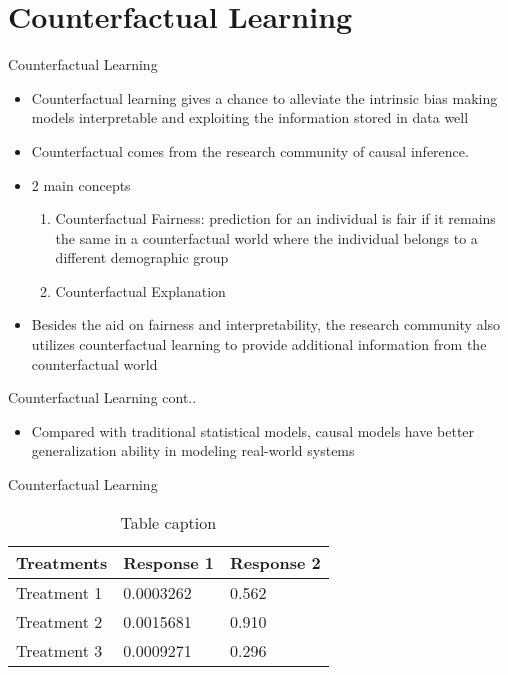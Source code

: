 \documentclass[aspectratio=169,xcolor=dvipsnames]{beamer}
\begin{document}
	\section{Counterfactual Learning}
	\begin{frame}{Counterfactual Learning}
		\begin{itemize}
			\item Counterfactual learning gives a chance to alleviate the intrinsic bias making models interpretable and exploiting the information stored in data well
			\item Counterfactual comes from the research community of causal inference. 
			\item 2 main concepts
			\begin{enumerate}
				\item Counterfactual Fairness: prediction for an individual is 			fair if it remains the same in a counterfactual world where the individual belongs to a different demographic	group
				\item Counterfactual Explanation
			\end{enumerate}
			\item Besides the aid on fairness and interpretability, the research community also utilizes counterfactual learning to provide additional information from the counterfactual world \cite{p1}
		\end{itemize}
	\end{frame}
	\begin{frame}{Counterfactual Learning cont..}
		\begin{itemize}
		\item Compared with traditional statistical models, causal 		models have better generalization ability in modeling real-world systems
		\end{itemize}
	\end{frame}
	\begin{frame}{Counterfactual Learning}
		\begin{table}
			\begin{tabular}{l l l}
				\toprule
				\textbf{Treatments} & \textbf{Response 1} & \textbf{Response 2} \\
				\midrule
				Treatment 1         & 0.0003262           & 0.562               \\
				Treatment 2         & 0.0015681           & 0.910               \\
				Treatment 3         & 0.0009271           & 0.296               \\
				\bottomrule
			\end{tabular}
			\caption{Table caption}
		\end{table}
	\end{frame}
	
\end{document}
